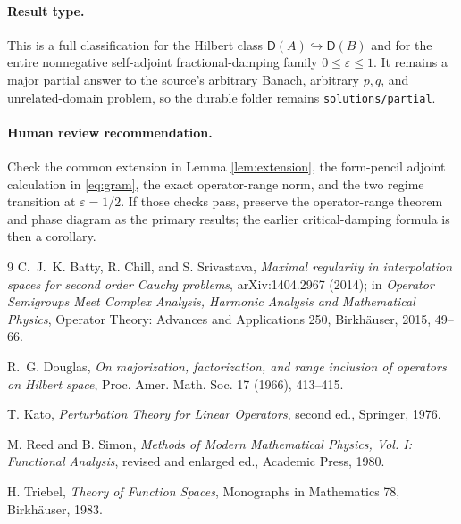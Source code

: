 \documentclass[11pt]{article}
\theoremstyle{remark}
\newcommand{\Dom}{\mathsf D}
\begin{document}
\paragraph{Result type.}
This is a full classification for the Hilbert class
$\Dom(A)\hookrightarrow\Dom(B)$ and for the entire nonnegative self-adjoint
fractional-damping family $0\le\varepsilon\le1$.  It remains a major partial
answer to the source's arbitrary Banach, arbitrary $p,q$, and unrelated-domain
problem, so the durable folder remains \texttt{solutions/partial}.

\paragraph{Human review recommendation.}
Check the common extension in Lemma \ref{lem:extension}, the form-pencil
adjoint calculation in \eqref{eq:gram}, the exact operator-range norm, and the
two regime transition at $\varepsilon=1/2$.  If those checks pass, preserve
the operator-range theorem and phase diagram as the primary results; the
earlier critical-damping formula is then a corollary.

\begin{thebibliography}{9}
C.~J.~K. Batty, R. Chill, and S. Srivastava,
\emph{Maximal regularity in interpolation spaces for second order Cauchy
problems}, arXiv:1404.2967 (2014); in \emph{Operator Semigroups Meet Complex
Analysis, Harmonic Analysis and Mathematical Physics}, Operator Theory:
Advances and Applications 250, Birkh\"auser, 2015, 49--66.

R.~G. Douglas,
\emph{On majorization, factorization, and range inclusion of operators on
Hilbert space}, Proc. Amer. Math. Soc. 17 (1966), 413--415.

T. Kato,
\emph{Perturbation Theory for Linear Operators}, second ed.,
Springer, 1976.

M. Reed and B. Simon,
\emph{Methods of Modern Mathematical Physics, Vol. I: Functional Analysis},
revised and enlarged ed., Academic Press, 1980.

H. Triebel,
\emph{Theory of Function Spaces}, Monographs in Mathematics 78,
Birkh\"auser, 1983.
\end{thebibliography}
\end{document}
